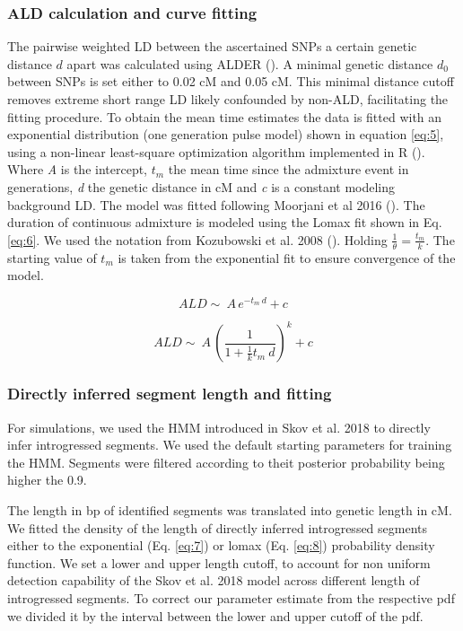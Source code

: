 \documentclass[]{article}
\begin{document}
\subsubsection{ALD calculation and curve fitting}\label{ALD calculation and curve fitting}

The pairwise weighted LD between the ascertained SNPs a certain genetic
distance \(d\) apart was calculated using ALDER
(\cite{loh_inferring_2013}). A minimal genetic distance \(d_0\) between
SNPs is set either to 0.02 cM and 0.05 cM. This minimal distance cutoff
removes extreme short range LD likely confounded by non-ALD,
facilitating the fitting procedure. To obtain the mean time estimates
the data is fitted with an exponential distribution (one generation pulse model) shown in equation
\ref{eq:5}, using a non-linear least-square optimization algorithm
implemented in R (\cite{R_Core_Team_2019}). Where \emph{A} is the
intercept, $t_m$ the mean time since the admixture event in generations,
\emph{d} the genetic distance in cM and \emph{c} is a constant modeling
background LD. The model was fitted following Moorjani et al 2016
(\cite{moorjani_genetic_2016}). The duration of continuous admixture is
modeled using the Lomax fit shown in Eq. \ref{eq:6}. We used the
notation from Kozubowski et al. 2008 (\cite{Kozubowski_Testing_2008}). Holding $\frac{1}{\theta} = \frac{t_m}{k}$.
The starting value of $t_m$  is taken from the exponential fit to ensure
convergence of the model.


\begin{equation}
\label{eq:5}
ALD \sim\ A\,e^{-t_m \:d}+c
\end{equation}

\begin{equation}
\label{eq:6}
ALD \sim\ A\,\left( \frac{1}{1 + \frac{1}{k}t_m \:d}\right) ^k+c
\end{equation}

\subsubsection{Directly inferred segment length and fitting }\label{Fitting of directly inferred segments length distribution}

For simulations, we used the HMM introduced in Skov et al. 2018 to directly infer introgressed segments. We used the default starting parameters for training the HMM. Segments were filtered according to theit posterior probability being higher the 0.9.

The length in bp of identified segments was translated into genetic length in cM. 
We fitted the density of the length of directly inferred introgressed segments either to the exponential (Eq. \ref{eq:7}) or lomax (Eq. \ref{eq:8}) probability density function. We set a lower and upper length cutoff, to account for non uniform detection capability of the Skov et al. 2018 model across different length of introgressed segments. To correct our parameter estimate from the respective pdf we divided it by the interval between the lower and upper cutoff of the pdf. 
\end{document}
